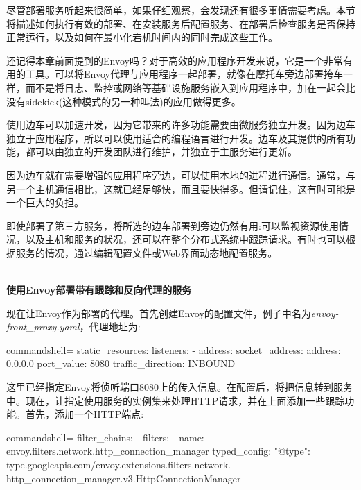 

尽管部署服务听起来很简单，如果仔细观察，会发现还有很多事情需要考虑。本节将描述如何执行有效的部署、在安装服务后配置服务、在部署后检查服务是否保持正常运行，以及如何在最小化宕机时间内的同时完成这些工作。


还记得本章前面提到的Envoy吗？对于高效的应用程序开发来说，它是一个非常有用的工具。可以将Envoy代理与应用程序一起部署，就像在摩托车旁边部署挎车一样，而不是将日志、监控或网络等基础设施服务嵌入到应用程序中，加在一起会比没有sidekick(这种模式的另一种叫法)的应用做得更多。

使用边车可以加速开发，因为它带来的许多功能需要由微服务独立开发。因为边车独立于应用程序，所以可以使用适合的编程语言进行开发。边车及其提供的所有功能，都可以由独立的开发团队进行维护，并独立于主服务进行更新。

因为边车就在需要增强的应用程序旁边，可以使用本地的进程进行通信。通常，与另一个主机通信相比，这就已经足够快，而且要快得多。但请记住，这有时可能是一个巨大的负担。

即使部署了第三方服务，将所选的边车部署到旁边仍然有用:可以监视资源使用情况，以及主机和服务的状况，还可以在整个分布式系统中跟踪请求。有时也可以根据服务的情况，通过编辑配置文件或Web界面动态地配置服务。

\hspace*{\fill} \\ %
\noindent
\textbf{使用Envoy部署带有跟踪和反向代理的服务}

现在让Envoy作为部署的代理。首先创建Envoy的配置文件，例子中名为\textit{envoy-front\_proxy.yaml}，代理地址为:

\begin{tcblisting}{commandshell={}}
static_resources:
  listeners:
    - address:
      socket_address:
        address: 0.0.0.0
        port_value: 8080
      traffic_direction: INBOUND
\end{tcblisting}

这里已经指定Envoy将侦听端口8080上的传入信息。在配置后，将把信息转到服务中。现在，让指定使用服务的实例集来处理HTTP请求，并在上面添加一些跟踪功能。首先，添加一个HTTP端点:

\begin{tcblisting}{commandshell={}}
filter_chains:
  - filters:
  - name: envoy.filters.network.http_connection_manager
    typed_config:
      "@type":
type.googleapis.com/envoy.extensions.filters.network.
http_connection_manager.v3.HttpConnectionManager
\end{tcblisting}

